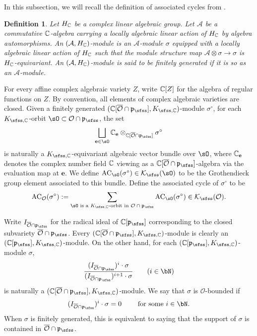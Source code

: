 \documentclass[12pt,a4paper]{amsart}
\newcommand{\CA}{{\mathcal {A}}}
\newcommand{\CK}{{\mathcal {K}}}
\newcommand{\CO}{{\mathcal {O}}}
\newcommand{\oS}{\operatorname{S}}
\newcommand{\p}{\mathfrak p}
\numberwithin{equation}{section}
\newtheorem{defn}[thm]{Definition}
\theoremstyle{remark}
\begin{document}
In this subsection, we will recall the definition of associated cycles from \cite{Vo89}.
\begin{defn}\label{spkmodule}
 Let $H_{\mathbb{C}}$ be a complex linear algebraic group. Let $\CA$ be a commutative $\mathbb{C}$-algebra carrying a locally algebraic linear action of $H_{\mathbb{C}}$ by algebra automorphisms.
  An $(\CA, H_\C)$-module is an  $\CA$-module
$
  \sigma
$
equipped with a locally algebraic linear action of $H_{\mathbb{C}}$ such that
the module structure map
$
  \CA\otimes \sigma\rightarrow \sigma
$
is $H_{\mathbb{C}}$-equivariant. An $(\CA, H_\C)$-module is said to be finitely generated if it is so as an $\CA$-module.

\end{defn}



For every affine complex algebraic variety $Z$, write $\mathbb{C}[Z]$ for the algebra of regular functions on $Z$. By convention, all elements of complex algebraic varieties are closed.
Given a finitely generated $(\C[\overline \CO\cap \p_\sfss], K_{\sfss, \C})$-module $\sigma^\circ$, for each $K_{\sfss, \C}$-orbit $\sO\subset \CO\cap \p_\sfss$, the set
\[
  \bigsqcup_{\mathbf e\in \sO} \C_\mathbf e\otimes_{\C[\overline \CO\cap \p_\sfss]}\sigma^\circ
\]
is naturally a $K_{\sfss, \C}$-equivariant algebraic vector bundle over $\sO$, where $\mathbb{C}_\mathbf e$  denotes the complex number field $\mathbb{C}$ viewing as a $\C[\overline \CO\cap \p_\sfss]$-algebra via the evaluation map at $\mathbf e$. We define $\mathrm{AC}_\sO(\sigma^\circ)\in \CK_\sfss(\sO)$ to be the Grothendieck group element associated to this bundle. Define the  associated cycle of $\sigma^\circ$ to be
\[
  \mathrm{AC}_\CO(\sigma^\circ):=\sum_{\sO\textrm{ is a   $K_{\sfss, \C}$-orbit in $ \CO\cap \p_\sfss$}} \mathrm{AC}_\sO(\sigma^\circ)\in \CK_\sfss(\CO).
\]


Write $I_{\overline \CO\cap \p_\sfss}$ for the radical ideal of $\C[\p_\sfss]$ corresponding to the closed subvariety $\overline \CO\cap \p_\sfss$.
Every $(\C[\overline \CO\cap \p_\sfss], K_{\sfss, \C})$-module is clearly an $(\C[\p_\sfss], K_{\sfss,\C})$-module.
On the other hand, for each  $(\C[\p_{\sfss}], K_{\sfss, \C})$-module $\sigma$,
\[
  \frac{(I_{\overline \CO\cap \p_\sfss})^i\cdot \sigma}{(I_{\overline \CO\cap \p_\sfss})^{i+1}\cdot \sigma}\qquad (i\in \bN)
\]
is naturally a $(\C[\overline \CO\cap \p_\sfss], K_{\sfss, \C})$-module.
We say that $\sigma$ is $\CO$-bounded if
\[
(I_{\overline \CO\cap \p_\sfss})^i \cdot\sigma=0\qquad
\textrm{
for some $i\in \bN$.}
\]
When $\sigma$ is finitely generated, this is equivalent to saying that  the support of $\sigma$ is contained in $\overline{\CO}\cap \p_\sfss$.
\end{document}
